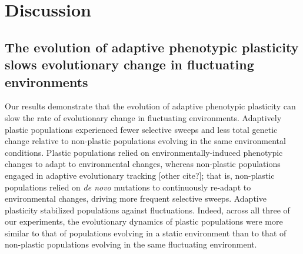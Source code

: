 

\section{Discussion}

\subsection{The evolution of adaptive phenotypic plasticity slows evolutionary change in fluctuating environments}

Our results demonstrate that the evolution of adaptive phenotypic plasticity can slow the rate of evolutionary change in fluctuating environments.
Adaptively plastic populations experienced fewer selective sweeps and less total genetic change relative to non-plastic populations evolving in the same environmental conditions.
Plastic populations relied on environmentally-induced phenotypic changes to adapt to environmental changes, whereas non-plastic populations engaged in adaptive evolutionary tracking \cite{simons_modes_2011}[other cite?]; that is, non-plastic populations relied on \textit{de novo} mutations to continuously re-adapt to environmental changes, driving more frequent selective sweeps.
Adaptive plasticity stabilized populations against fluctuations.
Indeed, across all three of our experiments, the evolutionary dynamics of plastic populations were more similar to that of populations evolving in a static environment than to that of non-plastic populations evolving in the same fluctuating environment.

